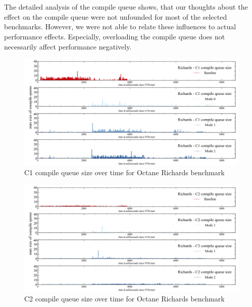 \\\\
The detailed analysis of the compile queue shows, that our thoughts about the effect on the compile queue were not unfounded for most of the selected benchmarks. However, we were not able to relate these influences to actual performance effects. Especially, overloading the compile queue does not necessarily affect performance negatively.
\begin{figure}[ht]
  \begin{center}
    \centering
    \includegraphics[width=1.0\textwidth]{figures/octane_queue_richards_separate_c1.png}
    \caption{C1 compile queue size over time for Octane Richards benchmark}
    \label{f:octane_queue_richards_separate_c1}
  \end{center}
\end{figure}
\begin{figure}[ht]
  \begin{center}
    \centering
    \includegraphics[width=1.0\textwidth]{figures/octane_queue_richards_separate_c2.png}
    \caption{C2 compile queue size over time for Octane Richards benchmark}
    \label{f:octane_queue_richards_separate_c2}
  \end{center}
\end{figure}
